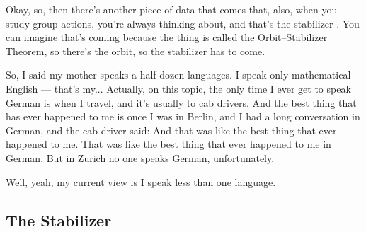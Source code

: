 \begin{speech}[00:16:08 - 00:17:15]
Okay, so, then there's another piece of data that comes that, also, when you study group actions, you're always thinking about, and that's the stabilizer . You can imagine that's coming because the thing is called the Orbit--Stabilizer Theorem, so there's the orbit, so the stabilizer has to come.

So, I said my mother speaks a half-dozen languages. I speak only mathematical English --- that's my... Actually, on this topic, the only time I ever get to speak German is when I travel, and it's usually to cab drivers. And the best thing that has ever happened to me is once I was in Berlin, and I had a long conversation in German, and the cab driver said:  And that was like the best thing that ever happened to me. That was like the best thing that ever happened to me in German. But in Zurich no one speaks German, unfortunately.

Well, yeah, my current view is I speak less than one language.
\end{speech}

\begin{hidden}
\end{hidden}

\subsection{The Stabilizer}

